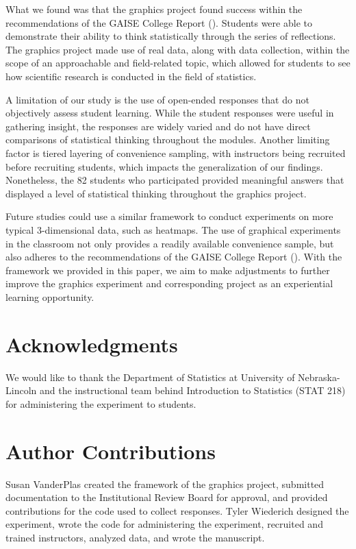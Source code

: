 \documentclass[
  12pt,
]{article}
\begin{document}
What we found was that the graphics project found success within the
recommendations of the GAISE College Report
(). Students
were able to demonstrate their ability to think statistically through
the series of reflections. The graphics project made use of real data,
along with data collection, within the scope of an approachable and
field-related topic, which allowed for students to see how scientific
research is conducted in the field of statistics.

A limitation of our study is the use of open-ended responses that do not
objectively assess student learning. While the student responses were
useful in gathering insight, the responses are widely varied and do not
have direct comparisons of statistical thinking throughout the modules.
Another limiting factor is tiered layering of convenience sampling, with
instructors being recruited before recruiting students, which impacts
the generalization of our findings. Nonetheless, the 82 students who
participated provided meaningful answers that displayed a level of
statistical thinking throughout the graphics project.

Future studies could use a similar framework to conduct experiments on
more typical 3-dimensional data, such as heatmaps. The use of graphical
experiments in the classroom not only provides a readily available
convenience sample, but also adheres to the recommendations of the GAISE
College Report (). With the framework we provided in this paper, we aim to make
adjustments to further improve the graphics experiment and corresponding
project as an experiential learning opportunity.

\section{Acknowledgments}\label{acknowledgments}

We would like to thank the Department of Statistics at University of
Nebraska-Lincoln and the instructional team behind Introduction to
Statistics (STAT 218) for administering the experiment to students.

\section{Author Contributions}\label{author-contributions}

Susan VanderPlas created the framework of the graphics project,
submitted documentation to the Institutional Review Board for approval,
and provided contributions for the code used to collect responses. Tyler
Wiederich designed the experiment, wrote the code for administering the
experiment, recruited and trained instructors, analyzed data, and wrote
the manuscript.
\end{document}
